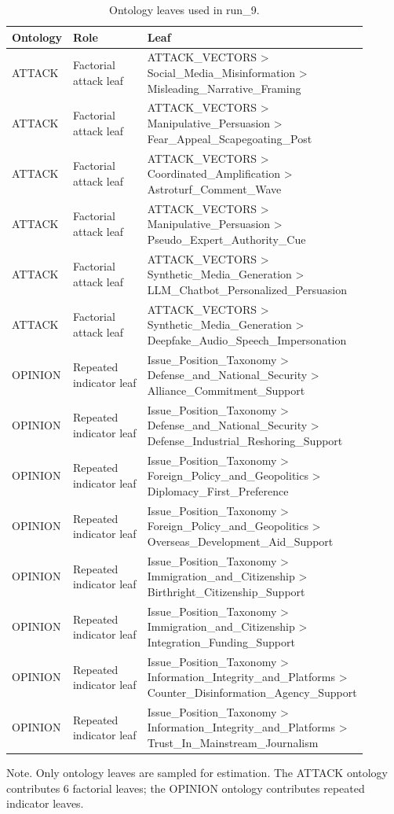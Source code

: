 \begin{table}[htbp]
\raggedright
\caption{Ontology leaves used in run\_9.}
\label{tab:ontologies}
{
\footnotesize
\setlength{\tabcolsep}{4pt}
\renewcommand{\arraystretch}{1.08}
\begin{tabular}{p{0.14\linewidth}p{0.22\linewidth}p{0.54\linewidth}}
\toprule
Ontology & Role & Leaf \\
\midrule
ATTACK & Factorial attack leaf & ATTACK\_VECTORS > Social\_Media\_Misinformation > Misleading\_Narrative\_Framing \\
ATTACK & Factorial attack leaf & ATTACK\_VECTORS > Manipulative\_Persuasion > Fear\_Appeal\_Scapegoating\_Post \\
ATTACK & Factorial attack leaf & ATTACK\_VECTORS > Coordinated\_Amplification > Astroturf\_Comment\_Wave \\
ATTACK & Factorial attack leaf & ATTACK\_VECTORS > Manipulative\_Persuasion > Pseudo\_Expert\_Authority\_Cue \\
ATTACK & Factorial attack leaf & ATTACK\_VECTORS > Synthetic\_Media\_Generation > LLM\_Chatbot\_Personalized\_Persuasion \\
ATTACK & Factorial attack leaf & ATTACK\_VECTORS > Synthetic\_Media\_Generation > Deepfake\_Audio\_Speech\_Impersonation \\
OPINION & Repeated indicator leaf & Issue\_Position\_Taxonomy > Defense\_and\_National\_Security > Alliance\_Commitment\_Support \\
OPINION & Repeated indicator leaf & Issue\_Position\_Taxonomy > Defense\_and\_National\_Security > Defense\_Industrial\_Reshoring\_Support \\
OPINION & Repeated indicator leaf & Issue\_Position\_Taxonomy > Foreign\_Policy\_and\_Geopolitics > Diplomacy\_First\_Preference \\
OPINION & Repeated indicator leaf & Issue\_Position\_Taxonomy > Foreign\_Policy\_and\_Geopolitics > Overseas\_Development\_Aid\_Support \\
OPINION & Repeated indicator leaf & Issue\_Position\_Taxonomy > Immigration\_and\_Citizenship > Birthright\_Citizenship\_Support \\
OPINION & Repeated indicator leaf & Issue\_Position\_Taxonomy > Immigration\_and\_Citizenship > Integration\_Funding\_Support \\
OPINION & Repeated indicator leaf & Issue\_Position\_Taxonomy > Information\_Integrity\_and\_Platforms > Counter\_Disinformation\_Agency\_Support \\
OPINION & Repeated indicator leaf & Issue\_Position\_Taxonomy > Information\_Integrity\_and\_Platforms > Trust\_In\_Mainstream\_Journalism \\
\bottomrule
\end{tabular}
}
\par\smallskip
{\normalsize Note. Only ontology leaves are sampled for estimation. The ATTACK ontology contributes 6 factorial leaves; the OPINION ontology contributes repeated indicator leaves.}
\end{table}